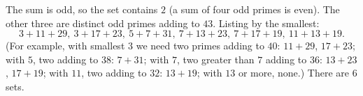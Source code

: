 The sum is odd, so the set contains $2$ (a sum of four odd primes is even). The other three are distinct odd primes adding to $43$. Listing by the smallest:
\[
3+11+29,\ 3+17+23,\ 5+7+31,\ 7+13+23,\ 7+17+19,\ 11+13+19 .
\]
(For example, with smallest $3$ we need two primes adding to $40$: $11+29$, $17+23$; with $5$, two adding to $38$: $7+31$; with $7$, two greater than $7$ adding to $36$: $13+23$, $17+19$; with $11$, two adding to $32$: $13+19$; with $13$ or more, none.) There are $\boxed{6}$ sets.
